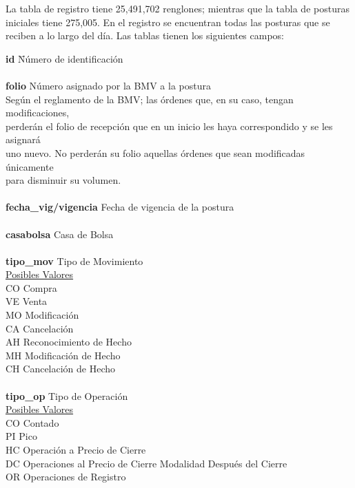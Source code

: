 \documentclass[11pt]{article}
\numberwithin{equation}{section} %
\begin{document}
La tabla de registro tiene 25,491,702 renglones; mientras que la tabla de posturas iniciales tiene 275,005. En el registro se encuentran todas las posturas que se reciben a lo largo del día. Las tablas tienen los siguientes campos:\\

\noindent
\begin{tabbing}
\textbf{id} \hspace{3cm} \= Número de identificación \hspace{1cm} \= \\
\\
\textbf{folio} \> Número asignado por la BMV a la postura\\
Según el reglamento de la BMV; las órdenes que, en su caso, tengan modificaciones,\\
perderán el folio de recepción que en un inicio les haya correspondido y se les asignará\\
uno nuevo. No perderán su folio aquellas órdenes que sean modificadas únicamente\\
para disminuir su volumen.\\
\\
\textbf{fecha\_vig/vigencia} \> Fecha de vigencia de la postura \\
\\
\textbf{casabolsa} \> Casa de Bolsa\\
\\
\textbf{tipo\_mov} \> Tipo de Movimiento\\
\underline{Posibles Valores} \\
CO \> Compra\\
VE \> Venta\\
MO \> Modificación\\
CA \> Cancelación\\
AH \> Reconocimiento de Hecho\\
MH \> Modificación de Hecho\\
CH \> Cancelación de Hecho\\
\\
\textbf{tipo\_op} \> Tipo de Operación\\
\underline{Posibles Valores} \\
CO \> Contado\\
PI \> Pico\\
HC \> Operación a Precio de Cierre\\
DC \> Operaciones al Precio de Cierre Modalidad Después del Cierre\\
OR \> Operaciones de Registro\\

\end{tabbing}
\end{document}
